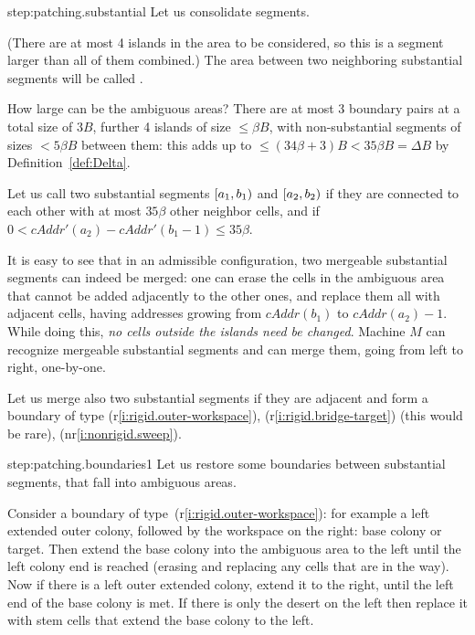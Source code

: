 \documentclass[12pt]{memoir}
\newcommand{\fld}[1]{\ensuremath{\textit{#1}}}
\def\B{B}
\newcommand{\cAddr}{\fld{cAddr}}
\begin{document}
\begin{Proof}
\begin{step+}{step:patching.substantial}
Let us consolidate segments.
\end{step+}
\begin{prooofi}
(There are at most 4 islands in the area to be considered, so this is a segment 
larger than all of them combined.)
The area between two neighboring substantial segments will be called .

How large can be the ambiguous areas?
There are at most 3 boundary pairs at a total size of \( 3\B \), 
further 4 islands of size \( \le\beta\B \), with non-substantial segments of sizes \( < 5\beta\B \)
between them: this adds up to \( \le (34\beta+3)\B<35\beta\B=\Delta\B \) 
by Definition~\ref{def:Delta}.

Let us call two substantial  segments \( [a_{1},b_{1}) \) and \( [a_{2},b_{2}) \)
 if they are connected to each other with at most
\( 35\beta \) other neighbor cells, and if \( 0<\cAddr'(a_{2})-\cAddr'(b_{1}-1)\le 35\beta \).

It is easy to see that in an admissible configuration, two mergeable substantial segments can indeed
be merged: one can erase the cells in the ambiguous area
that cannot be added adjacently to the other ones, and replace them all with adjacent cells,
having addresses growing from \( \cAddr(b_{1}) \) to \( \cAddr(a_{2})-1 \).
While doing this, \emph{no cells outside the islands need be changed}.
Machine \( M \) can recognize mergeable substantial segments and can merge them, going from left to 
right, one-by-one.

Let us merge also two substantial segments if they are adjacent and form a boundary of type
(r\ref{i:rigid.outer-workspace}), (r\ref{i:rigid.bridge-target}) (this would be rare),
(nr\ref{i:nonrigid.sweep}).
\end{prooofi} %

\begin{step+}{step:patching.boundaries1}
Let us restore some boundaries between substantial segments,
that fall into ambiguous areas.
\end{step+}
\begin{prooofi}
Consider a boundary of type~(r\ref{i:rigid.outer-workspace}): for example
a left extended outer colony, followed by the workspace on the right: base colony or target.
Then extend the base colony into the ambiguous area
to the left until the left colony end is reached
(erasing and replacing any cells that are in the way).
Now if there is a left outer extended colony, extend it to the right, until
the left end of the base colony is met.
If there is only the desert on the left then replace it with stem cells that extend the base
colony to the left.


\end{prooofi}
\end{Proof}
\end{document}
